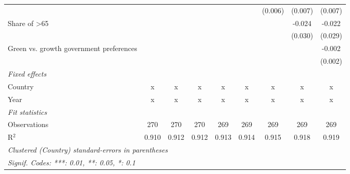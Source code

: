 \begin{table}[htbp]
\begin{tabular}{lcccccccc}
                                                            &         &         &         &         &         & (0.006) & (0.007) & (0.007)\\   
      Share of >65                                          &         &         &         &         &         &         & -0.024  & -0.022\\   
                                                            &         &         &         &         &         &         & (0.030) & (0.029)\\   
      Green vs. growth government preferences               &         &         &         &         &         &         &         & -0.002\\   
                                                            &         &         &         &         &         &         &         & (0.002)\\   
      \emph{Fixed effects}\\
      Country                                               & x       & x       & x       & x       & x       & x       & x       & x\\  
      Year                                                  & x       & x       & x       & x       & x       & x       & x       & x\\  
      \midrule \emph{Fit statistics}\\
      Observations                                          & 270     & 270     & 270     & 269     & 269     & 269     & 269     & 269\\  
      R$^2$                                                 & 0.910   & 0.912   & 0.912   & 0.913   & 0.914   & 0.915   & 0.918   & 0.919\\  
      \midrule
      \multicolumn{9}{l}{\emph{Clustered (Country) standard-errors in parentheses}}\\
      \multicolumn{9}{l}{\emph{Signif. Codes: ***: 0.01, **: 0.05, *: 0.1}}\\
   \end{tabular}
\end{table}


